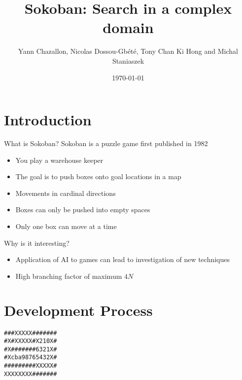 \documentclass{beamer}
\title[Sokoban] %
{Sokoban: Search in a complex domain}
\author[Chazallon, Dossou-Gb{\'e}t{\'e}, Hong, Staniaszek]{Yann Chazallon,  Nicolas Dossou-Gb{\'e}t{\'e}, Tony Chan Ki Hong and Michal Staniaszek}
\date{\today}
\begin{document}
\begin{frame}
  \titlepage
\end{frame}

\section{Introduction}

\begin{frame}{What is Sokoban?}
  Sokoban is a puzzle game first published in 1982
  \begin{itemize}
    \item You play a warehouse keeper
    \item The goal is to push boxes onto goal locations in a map
    \item Movements in cardinal directions
    \item Boxes can only be pushed into empty spaces
    \item Only one box can move at a time
  \end{itemize}
\end{frame} 

\begin{frame}{Why is it interesting?}
  \begin{itemize}
  \item Application of AI to games can lead to investigation of new techniques
  \item High branching factor of maximum $4N$
  \end{itemize}
\end{frame}

\section{Development Process}


\begin{lrbox}{\mapstatic}
  \begin{minipage}{.25\textwidth}
\centering
\begin{BVerbatim}
###XXXXX#######
#X#XXXXX#X210X#
#X#######6321X#
#Xcba98765432X#
#########XXXXX#
XXXXXXXX#######
\end{BVerbatim}
  \end{minipage}
\end{lrbox}%
\end{document}
